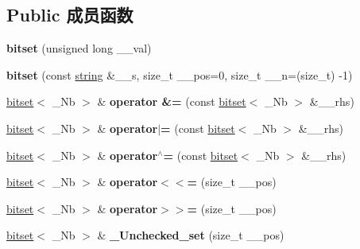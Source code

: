 \subsection*{Public 成员函数}
\begin{DoxyCompactItemize}
\item 
\mbox{\label{classbitset_a50703b363da55cea32f3fae86bea6bea}} 
{\bfseries bitset} (unsigned long \+\_\+\+\_\+val)
\item 
\mbox{\label{classbitset_acb56ac1a06c9b936d7ccafc5485c277c}} 
{\bfseries bitset} (const \hyperlink{structstring}{string} \&\+\_\+\+\_\+s, size\+\_\+t \+\_\+\+\_\+pos=0, size\+\_\+t \+\_\+\+\_\+n=(size\+\_\+t) -\/1)
\item 
\mbox{\label{classbitset_ad7fe552eba5b5c645255dc7cff423a88}} 
\hyperlink{classbitset}{bitset}$<$ \+\_\+\+Nb $>$ \& {\bfseries operator \&=} (const \hyperlink{classbitset}{bitset}$<$ \+\_\+\+Nb $>$ \&\+\_\+\+\_\+rhs)
\item 
\mbox{\label{classbitset_a9aa8c4b3566f1e1850d90452a4225c54}} 
\hyperlink{classbitset}{bitset}$<$ \+\_\+\+Nb $>$ \& {\bfseries operator$\vert$=} (const \hyperlink{classbitset}{bitset}$<$ \+\_\+\+Nb $>$ \&\+\_\+\+\_\+rhs)
\item 
\mbox{\label{classbitset_ad8f61b5a74925631dbe293e1cf41cecd}} 
\hyperlink{classbitset}{bitset}$<$ \+\_\+\+Nb $>$ \& {\bfseries operator$^\wedge$=} (const \hyperlink{classbitset}{bitset}$<$ \+\_\+\+Nb $>$ \&\+\_\+\+\_\+rhs)
\item 
\mbox{\label{classbitset_a67e07e4ccc4b16913445587d091ca100}} 
\hyperlink{classbitset}{bitset}$<$ \+\_\+\+Nb $>$ \& {\bfseries operator$<$$<$=} (size\+\_\+t \+\_\+\+\_\+pos)
\item 
\mbox{\label{classbitset_a98a53306f02d7cff9dc4e366df08271a}} 
\hyperlink{classbitset}{bitset}$<$ \+\_\+\+Nb $>$ \& {\bfseries operator$>$$>$=} (size\+\_\+t \+\_\+\+\_\+pos)
\item 
\mbox{\label{classbitset_a588ef249bc7cebcf3c924d3ae629c372}} 
\hyperlink{classbitset}{bitset}$<$ \+\_\+\+Nb $>$ \& {\bfseries \+\_\+\+Unchecked\+\_\+set} (size\+\_\+t \+\_\+\+\_\+pos)

\end{DoxyCompactItemize}
